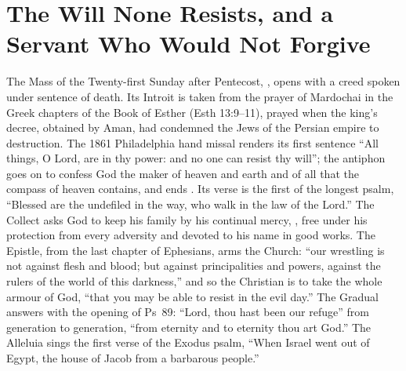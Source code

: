 \section{The Will None Resists, and a Servant Who Would Not Forgive}
\label{sec:opening}

The Mass of the Twenty-first Sunday after Pentecost, , opens with a creed spoken under sentence of death. Its Introit is taken
from the prayer of Mardochai in the Greek chapters of the Book of Esther
(Esth 13:9--11), prayed when the king's decree, obtained by Aman, had condemned
the Jews of the Persian empire to destruction. The 1861 Philadelphia hand missal
renders its first sentence ``All things, O Lord, are in thy power: and no one
can resist thy will''; the antiphon goes on to confess God the maker of heaven
and earth and of all that the compass of heaven contains, and ends . Its verse is the first of the longest psalm, ``Blessed are
the undefiled in the way, who walk in the law of the Lord.'' The Collect asks
God to keep his family by his continual mercy, , free
under his protection from every adversity and devoted to his name in good works.
The Epistle, from the last chapter of Ephesians, arms the Church: ``our
wrestling is not against flesh and blood; but against principalities and
powers, against the rulers of the world of this darkness,'' and so the
Christian is to take the whole armour of God, ``that you may be able to resist
in the evil day.'' The Gradual answers with the opening of Ps~89: ``Lord, thou
hast been our refuge'' from generation to generation, ``from eternity and to
eternity thou art God.'' The Alleluia sings the first verse of the Exodus psalm,
``When Israel went out of Egypt, the house of Jacob from a barbarous people.''

